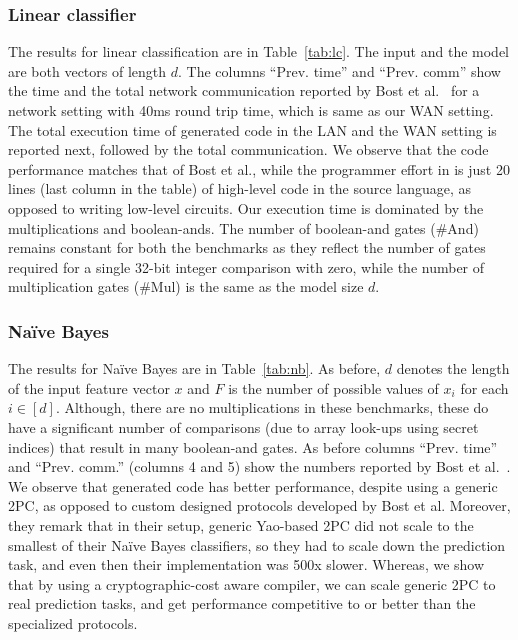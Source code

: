 \subsubsection*{Linear classifier}The results for linear
classification are in Table~\ref{tab:lc}. The
input and the model are both vectors of length $d$. The columns
``Prev. time'' and ``Prev. comm'' show the time and the total
network communication reported by Bost et al.~\cite{shafindss} for a
network setting with 40ms
round trip time, which is same as our WAN setting. The total execution
time
of \tool generated code in the LAN and the WAN setting is reported
next, followed by the total communication.
We observe that the \tool code performance matches that of Bost
et al., while the programmer effort in \tool is just 20
lines (last column in the table) of high-level code in the \tool
source language, as
opposed to writing low-level circuits.  Our execution time is dominated by the multiplications and
boolean-ands.
The number of boolean-and gates (\#And) remains constant for both the
benchmarks as they reflect the number of gates required for a
single 32-bit integer comparison with zero, while the number of
multiplication gates (\#Mul) is the same as the model size $d$.

\subsubsection*{Na\"{i}ve Bayes} The results for Na\"{i}ve Bayes are
in Table~\ref{tab:nb}. As before, $d$ denotes the length of the input
feature vector $x$ and $F$ is the number of possible values of $x_i$
for each $i \in [d]$.
Although, there are no multiplications in these benchmarks, these do
have a significant number of comparisons (due to array look-ups using
secret indices) that
result in many boolean-and gates. %
As before columns ``Prev. time'' and ``Prev. comm.'' (columns 4 and 5)
show the numbers reported
by Bost et al.~\cite{shafindss}. We observe that \tool generated code
has better performance, despite using a generic 2PC,
as opposed to custom designed protocols developed by Bost et
al. Moreover, they remark that in their setup, generic Yao-based 2PC
did not scale to the smallest of their Na\"{i}ve Bayes classifiers, so
they had to scale down the prediction task, and even then their
implementation was 500x slower. Whereas, we show that by using a
cryptographic-cost aware compiler, we can scale generic 2PC to real
prediction tasks, and get performance competitive to or better than the
specialized protocols. 

